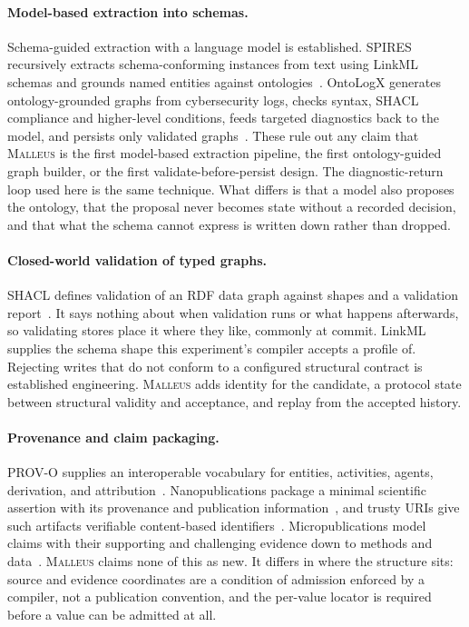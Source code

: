 \documentclass[10pt]{article}
\newcommand{\malleus}{\textsc{Malleus}}
\begin{document}
\paragraph{Model-based extraction into schemas.} Schema-guided extraction with a language model is established. SPIRES recursively extracts schema-conforming instances from text using LinkML schemas and grounds named entities against ontologies~\citep{caufield2024spires}. OntoLogX generates ontology-grounded graphs from cybersecurity logs, checks syntax, SHACL compliance and higher-level conditions, feeds targeted diagnostics back to the model, and persists only validated graphs~\citep{cotti2026ontologx}. These rule out any claim that \malleus{} is the first model-based extraction pipeline, the first ontology-guided graph builder, or the first validate-before-persist design. The diagnostic-return loop used here is the same technique. What differs is that a model also proposes the ontology, that the proposal never becomes state without a recorded decision, and that what the schema cannot express is written down rather than dropped.

\paragraph{Closed-world validation of typed graphs.} SHACL defines validation of an RDF data graph against shapes and a validation report~\citep{knublauch2017shacl}. It says nothing about when validation runs or what happens afterwards, so validating stores place it where they like, commonly at commit. LinkML supplies the schema shape this experiment's compiler accepts a profile of. Rejecting writes that do not conform to a configured structural contract is established engineering. \malleus{} adds identity for the candidate, a protocol state between structural validity and acceptance, and replay from the accepted history.

\paragraph{Provenance and claim packaging.} PROV-O supplies an interoperable vocabulary for entities, activities, agents, derivation, and attribution~\citep{lebo2013provo}. Nanopublications package a minimal scientific assertion with its provenance and publication information~\citep{groth2010nanopublication}, and trusty URIs give such artifacts verifiable content-based identifiers~\citep{kuhn2014trusty}. Micropublications model claims with their supporting and challenging evidence down to methods and data~\citep{clark2014micropublications}. \malleus{} claims none of this as new. It differs in where the structure sits: source and evidence coordinates are a condition of admission enforced by a compiler, not a publication convention, and the per-value locator is required before a value can be admitted at all.
\end{document}
